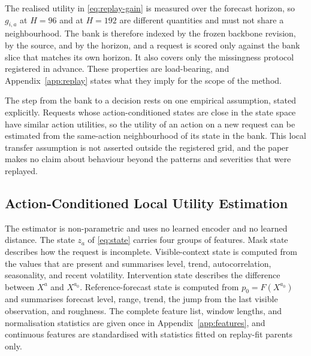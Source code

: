 \documentclass{article}
\begin{document}
The realised utility in \eqref{eq:replay-gain} is measured over the forecast horizon, so
$g_{i,a}$ at $H=96$ and at $H=192$ are different quantities and must not share a
neighbourhood. The bank is therefore indexed by the frozen backbone revision, by the source,
and by the horizon, and a request is scored only against the bank slice that matches its own
horizon. It also covers only the missingness protocol registered in advance. These properties
are load-bearing, and Appendix~\ref{app:replay} states what they imply for the scope of the
method.

The step from the bank to a decision rests on one empirical assumption, stated explicitly.
Requests whose action-conditioned states are close in the state space have similar action
utilities, so the utility of an action on a new request can be estimated from the same-action
neighbourhood of its state in the bank. This local transfer assumption is not asserted outside
the registered grid, and the paper makes no claim about behaviour beyond the patterns and
severities that were replayed.

\subsection{Action-Conditioned Local Utility Estimation}
\label{sec:method-scoring}
The estimator is non-parametric and uses no learned encoder and no learned distance. The state
$z_a$ of \eqref{eq:state} carries four groups of features. Mask state describes how the request
is incomplete. Visible-context state is computed from the values that are present and
summarises level, trend, autocorrelation, seasonality, and recent volatility. Intervention
state describes the difference between $X^{a}$ and $X^{a_0}$. Reference-forecast state is
computed from $p_0 = F(X^{a_0})$ and summarises forecast level, range, trend, the jump from the
last visible observation, and roughness. The complete feature list, window lengths, and
normalisation statistics are given once in Appendix~\ref{app:features}, and continuous features
are standardised with statistics fitted on replay-fit parents only.
\end{document}
